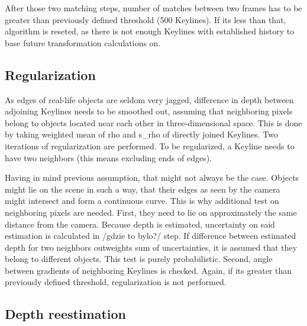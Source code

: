 After those two matching steps, number of matches between two frames has to be greater than previously defined threshold (500 Keylines). If its less than that, algorithm is reseted, as there is not enough Keylines with established history to base future transformation calculations on.

\subsection{Regularization}

%
%

As edges of real-life objects are seldom very jagged, difference in depth between adjoining Keylines needs to be smoothed out, assuming that neighboring pixels belong to objects located near each other in three-dimensional space. This is done by taking weighted mean of rho and s\_rho of directly joined Keylines. Two iterations of regularization are performed. To be regularized, a Keyline needs to have two neighbors (this means excluding ends of edges).

%
%
%
%

Having in mind previous assumption, that might not always be the case. Objects might lie on the scene in such a way, that their edges as seen by the camera might intersect and form a continuous curve. This is why additional test on neighboring pixels are needed. First, they need to lie on approximately the same distance from the camera. Because depth is estimated, uncertainty on said estimation is calculated in /gdzie to bylo?/ step. If difference between estimated depth for two neighbors outweights sum of uncertainties, it is assumed that they belong to different objects. This test is purely probabilistic. Second, angle between gradients of neighboring Keylines is checked. Again, if its greater than previously defined threshold, regularization is not performed.

\subsection{Depth reestimation}


